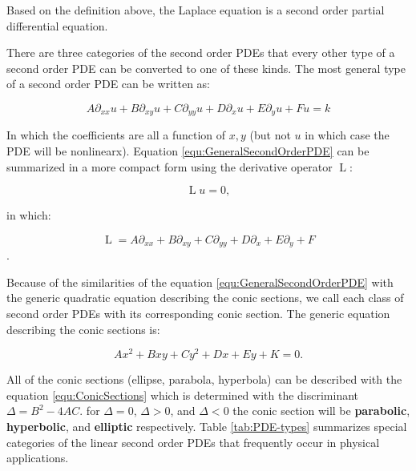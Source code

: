 Based on the definition above, the Laplace equation is a second order partial differential equation. 

There are three categories of the second order PDEs that every other type of a second order PDE can be converted to one of these kinds. The most general type of a second order PDE can be written as:

\begin{equation}
	A \partial_{xx} u + B \partial_{xy} u + C \partial_{yy} u + D \partial_{x} u + E \partial_{y} u + F u = k
	\label{equ:GeneralSecondOrderPDE}
\end{equation}

In which the coefficients are all a function of $x,y$ (but not $ u $ in which case the PDE will be nonlinearx). Equation \ref{equ:GeneralSecondOrderPDE} can be summarized in a more compact form using the derivative operator $ \operatorname{L} $: 

\[	 \operatorname{L} u = 0,	\]

in which:

\[  \operatorname{L} = A \partial_{xx} + B \partial_{xy} + C \partial_{yy} + D \partial_{x} + E \partial_{y} + F \].

Because of the similarities of the equation \ref{equ:GeneralSecondOrderPDE} with the generic quadratic equation describing the conic sections, we call each class of second order PDEs with its corresponding conic section. The generic equation describing the conic sections is:

\begin{equation}
	A x^2 + B x y + C y^2 + D x + E y + K = 0.
	\label{equ:ConicSections}
\end{equation}


All of the conic sections (ellipse, parabola, hyperbola) can be described with the equation \ref{equ:ConicSections} which is determined with the discriminant $ \Delta = B^2 - 4 A C $. for $ \Delta=0 $, $ \Delta > 0 $, and $ \Delta < 0 $ the conic section will be \textbf{parabolic}, \textbf{hyperbolic}, and \textbf{elliptic} respectively. Table \ref{tab:PDE-types} summarizes special categories of the linear second order PDEs that frequently occur in physical applications. \newline


